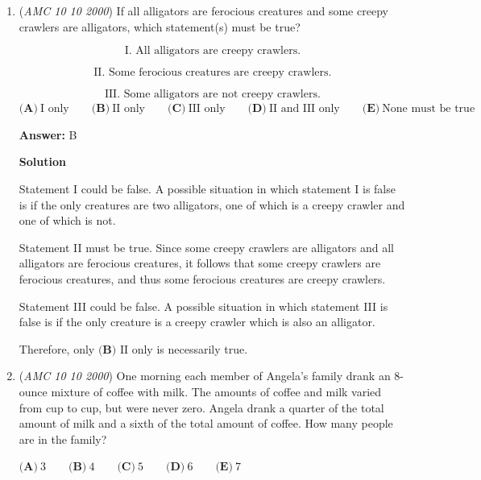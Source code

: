 \begin{enumerate}
 Plugging these integer values into our objective function:
 \[f(3, 3, 4) = (3)(3)(4) + (3)(3) + (3)(4) + (3)(4) = 36 + 9 + 12 + 12 = 69\]

 Thus, the maximum value is $\boxed{\textbf{(C)}\ 69.}$.

 


	\item (\textit{AMC 10 10 2000}) If all alligators are ferocious creatures and some creepy crawlers are alligators, which statement(s) must be true?


 
 \[\textrm{I. All alligators are creepy crawlers.}\]

 \[\textrm{II. Some ferocious creatures are creepy crawlers.}\]

 \[\textrm{III. Some alligators are not creepy crawlers.}\]
$\textbf{(A)}\ \text{I only} \qquad\textbf{(B)}\ \text{II only} \qquad\textbf{(C)}\ \text{III only} \qquad\textbf{(D)}\ \text{II and III only} \qquad\textbf{(E)}\ \text{None must be true}$

 \textbf{Answer: }B



\textbf{Solution}

Statement I could be false.  A possible situation in which statement I is false is if the only creatures are two alligators, one of which is a creepy crawler and one of which is not.

 Statement II must be true.  Since some creepy crawlers are alligators and all alligators are ferocious creatures, it follows that some creepy crawlers are ferocious creatures, and thus some ferocious creatures are creepy crawlers.

 Statement III could be false.  A possible situation in which statement III is false is if the only creature is a creepy crawler which is also an alligator.

 Therefore, only $\boxed{\textbf{(B)}\text{ II only}}$ is necessarily true.

 


	\item (\textit{AMC 10 10 2000}) One morning each member of Angela's family drank an 8-ounce mixture of coffee with milk. The amounts of coffee and milk varied from cup to cup, but were never zero. Angela drank a quarter of the total amount of milk and a sixth of the total amount of coffee. How many people are in the family?


 $\textbf{(A)}\ 3 \qquad\textbf{(B)}\ 4 \qquad\textbf{(C)}\ 5 \qquad\textbf{(D)}\ 6 \qquad\textbf{(E)}\ 7$


\end{enumerate}
